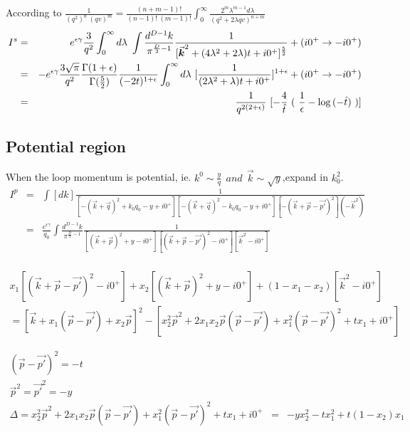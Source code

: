 \documentclass{article}
\begin{document}
According to $\displaystyle\frac{1}{(q^2)^n~(qv)^m}=\frac{(n+m-1)!}{(n-1)!~(m-1)!}\int^\infty_0 \frac{2^m\lambda^{m-1}d\lambda}{(q^2+2\lambda qv)^{n+m}}$\\

\begin{eqnarray}
I^s&=&e^{\epsilon\gamma}\frac{3}{q^2}\int^\infty_0d\lambda~\int\frac{d^{D-1}k}{\pi^{\frac{D}{2}-1}}\frac{1}{[\va*{k}^2+(4\lambda^2+2\lambda)t+i0^+]^\frac{5}{2}}+(i0^+\rightarrow -i0^+)\\\nonumber
&=&-e^{\epsilon\gamma}\frac{3\sqrt{\pi}}{q^2}\frac{\Gamma(1+\epsilon)}{\Gamma(\frac{5}{2})}\frac{1}{(-2t)^{1+\epsilon}}\int^\infty_0d\lambda~[\frac{1}{(2\lambda^2+\lambda)t+i0^+}]^{1+\epsilon}+(i0^+\rightarrow -i0^+)\\\nonumber
&=&\frac{1}{q^{2(2+\epsilon)}}~[-\frac{4}{\hat{t}}~(~\frac{1}{\epsilon}-\log{(-\hat{t})}~)]
\end{eqnarray}


\subsection{Potential region}
When the loop momentum is potential, ie. $k^0\sim \frac{y}{q}~~and~~\vec{k}\sim \sqrt{y}$,\quad expand in $k_0^2$.\\

\begin{eqnarray}
I^p&=&\int[dk]\frac{1}{[-(\vec{k}+\vec{q})^2+k_0 q_0-y+i0^+][-(\vec{k}+\vec{q})^2-k_0 q_0-y+i0^+][-(\vec{k}+\vec{p}-\vec{p'})^2](-\vec{k}^2)}\\\nonumber
&=&\frac{e^{\epsilon\gamma}}{q_0}\int\frac{d^{D-1}k}{\pi^{\frac{D}{2}-1}}\frac{1}{[(\vec{k}+\vec{p})^2+y-i0^+][(\vec{k}+\vec{p}-\vec{p'})^2-i0^+][\vec{k}^2-i0^+]}\\
\end{eqnarray}

\begin{eqnarray*}
x_1[(\vec{k}+\vec{p}-\vec{p'})^2-i0^+]+x_2[(\vec{k}+\vec{p})^2+y-i0^+]+(1-x_1-x_2)[\vec{k}^2-i0^+]\\
=[\vec{k}+x_1(\vec{p}-\vec{p'})+x_2\vec{p}]^2-[x_2^2\vec{p}^2+2x_1x_2\vec{p}(\vec{p}-\vec{p'})+x_1^2(\vec{p}-\vec{p'})^2+tx_1+i0^+]
\end{eqnarray*}

\begin{eqnarray*}
(\vec{p}-\vec{p'})^2=-t\\
\vec{p}^2=\vec{p'}^2=-y\\
\Delta=x_2^2\vec{p}^2+2x_1x_2\vec{p}(\vec{p}-\vec{p'})+x_1^2(\vec{p}-\vec{p'})^2+tx_1+i0^+
&=&-yx_2^2-tx_1^2+t(1-x_2)x_1
\end{eqnarray*}
\end{document}
